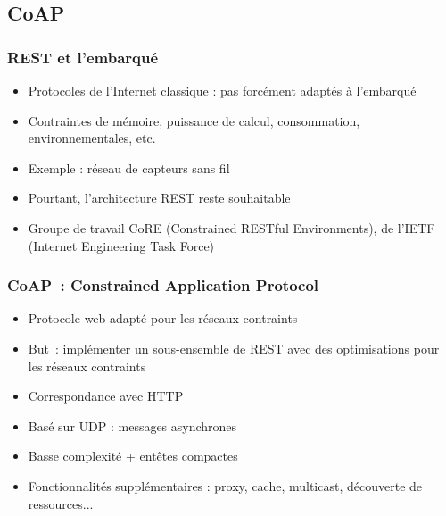 \documentclass{beamer}
\begin{document}
\subsection{CoAP}
\begin{frame}
  \frametitle{REST et l'embarqué}
  \begin{itemize}
  \item Protocoles de l'Internet classique : pas forcément adaptés à
    l'embarqué
  \item Contraintes de mémoire, puissance de calcul, consommation,
    environnementales, etc.
  \item Exemple : réseau de capteurs sans fil
    \pause   
  \item Pourtant, l'architecture REST reste souhaitable
    \pause
  \item Groupe de travail CoRE (Constrained RESTful Environments),
    de l'IETF (Internet Engineering Task Force)
  \end{itemize}
\end{frame}

\begin{frame}
  \frametitle{CoAP~: Constrained Application Protocol}
  \begin{itemize}
  \item Protocole web adapté pour les réseaux contraints
    \pause
  \item But~: implémenter un sous-ensemble de REST avec des
    optimisations pour les réseaux contraints
    \pause
  \item Correspondance avec HTTP
    \pause
  \item Basé sur UDP : messages asynchrones
    \pause
  \item Basse complexité + entêtes compactes
    \pause
  \item Fonctionnalités supplémentaires : proxy, cache, multicast, découverte de
    ressources...
  \end{itemize}
\end{frame}
\end{document}
